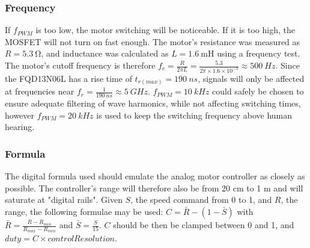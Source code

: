 \subsubsection{Frequency}

If $f_{PWM}$ is too low, the motor switching will be noticeable. If it is too high, the MOSFET will not turn on fast enough.
The motor's resistance was measured as $R = \SI{5.3}{\ohm}$, and inductance was calculated as $L = \SI{1.6}{\milli\henry}$ using a frequency test.
The motor's cutoff frequency is therefore $f_c = \frac{R}{2 \pi L} = \frac{5.3}{2 \pi \times 1.6 \times 10^{-3}} \approx \SI{500}{Hz}$.
Since the FQD13N06L has a rise time of $t_{r(max)} = \SI{190}{ns}$, signals will only be affected at frequencies near $f_r = \frac{1}{\SI{190}{ns}} \approx \SI{5}{GHz}$.
$f_{PWM} = \SI{10}{kHz}$ could safely be chosen to ensure adequate filtering of wave harmonics, while not affecting switching times,
however $f_{PWM} = \SI{20}{kHz}$ is used to keep the switching frequency above human hearing.

\subsubsection{Formula}

The digital formula used should emulate the analog motor controller as closely as possible. The controller's range will therefore also be from 20 cm to 1 m
and will saturate at "digital rails". Given $S$, the speed command from 0 to 1, and $R$, the range, the following formulae may be used:
$C = \bar{R} - (1 - \bar{S})$ with $\bar{R} = \frac{R - R_{min}}{R_{max} - R_{min}}$ and $\bar{S} = \frac{S}{15}$. $C$ should be then be clamped between 0 and 1,
and $duty = C \times controlResolution$.